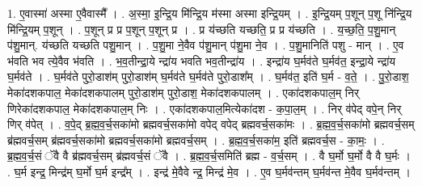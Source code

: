 \documentclass[17pt]{extarticle}
\begin{document}
1. ए॒वास्मा॑ अस्मा ए॒वैवास्मै᳚ । . अ॒स्मा॒ इ॒न्द्रि॒य मि॑न्द्रि॒य म॑स्मा अस्मा इन्द्रि॒यम् । . इ॒न्द्रि॒यम् प॒शून् प॒शू नि॑न्द्रि॒य मि॑न्द्रि॒यम् प॒शून् । . प॒शून् प्र प्र प॒शून् प॒शून् प्र । . प्र य॑च्छति यच्छति॒ प्र प्र य॑च्छति । . य॒च्छ॒ति॒ प॒शु॒मान् प॑शु॒मान्. य॑च्छति यच्छति पशु॒मान् । . प॒शु॒मा ने॒वैव प॑शु॒मान् प॑शु॒मा ने॒व । . प॒शु॒मानिति॑ पशु - मान् । . ए॒व भ॑वति भव त्ये॒वैव भ॑वति । . भ॒व॒तीन्द्रा॒ये न्द्रा॑य भवति भव॒तीन्द्रा॑य । . इन्द्रा॑य घ॒र्मव॑ते घ॒र्मव॑त॒ इन्द्रा॒ये न्द्रा॑य घ॒र्मव॑ते । . घ॒र्मव॑ते पुरो॒डाश॑म् पुरो॒डाश॑म् घ॒र्मव॑ते घ॒र्मव॑ते पुरो॒डाश᳚म् । . घ॒र्मव॑त॒ इति॑ घ॒र्म - व॒ते॒ । . पु॒रो॒डाश॒ मेका॑दशकपाल॒ मेका॑दशकपालम् पुरो॒डाश॑म् पुरो॒डाश॒ मेका॑दशकपालम् । . एका॑दशकपाल॒म् निर् णिरेका॑दशकपाल॒ मेका॑दशकपाल॒म् निः । . एका॑दशकपाल॒मित्येका॑दश - क॒पा॒ल॒म् । . निर् व॑पेद् वपे॒न् निर् णिर् व॑पेत् । . व॒पे॒द् ब्र॒ह्म॒व॒र्च॒सका॑मो ब्रह्मवर्च॒सका॑मो वपेद् वपेद् ब्रह्मवर्च॒सका॑मः । . ब्र॒ह्म॒व॒र्च॒सका॑मो ब्रह्मवर्च॒सम् ब्र॑ह्मवर्च॒सम् ब्र॑ह्मवर्च॒सका॑मो ब्रह्मवर्च॒सका॑मो ब्रह्मवर्च॒सम् । . ब्र॒ह्म॒व॒र्च॒सका॑म॒ इति॑ ब्रह्मवर्च॒स - का॒मः॒ । . ब्र॒ह्म॒व॒र्च॒सं ॅवै वै ब्र॑ह्मवर्च॒सम् ब्र॑ह्मवर्च॒सं ॅवै । . ब्र॒ह्म॒व॒र्च॒समिति॑ ब्रह्म - व॒र्च॒सम् । . वै घ॒र्मो घ॒र्मो वै वै घ॒र्मः । . घ॒र्म इन्द्र॒ मिन्द्र॑म् घ॒र्मो घ॒र्म इन्द्र᳚म् । . इन्द्र॑ मे॒वैवे न्द्र॒ मिन्द्र॑ मे॒व । . ए॒व घ॒र्मव॑न्तम् घ॒र्मव॑न्त मे॒वैव घ॒र्मव॑न्तम् । \newline
\end{document}
